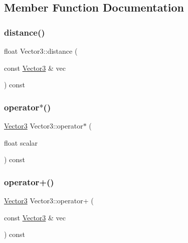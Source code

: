 \subsection{Member Function Documentation}
\mbox{\label{class_vector3_a9dd2015e58d753dd4e3f1ba47eeaaf35}} 
\subsubsection{\texorpdfstring{distance()}{distance()}}
{\footnotesize\ttfamily float Vector3\+::distance (\begin{DoxyParamCaption}\item[{const \hyperlink{class_vector3}{Vector3} \&}]{vec }\end{DoxyParamCaption}) const\hspace{0.3cm}{\ttfamily [inline]}}

\mbox{\label{class_vector3_ad572247e5bd9afab9d1639610f0b0ac6}} 
\subsubsection{\texorpdfstring{operator$\ast$()}{operator*()}}
{\footnotesize\ttfamily \hyperlink{class_vector3}{Vector3} Vector3\+::operator$\ast$ (\begin{DoxyParamCaption}\item[{float}]{scalar }\end{DoxyParamCaption}) const\hspace{0.3cm}{\ttfamily [inline]}}

\mbox{\label{class_vector3_a87c9bc23295bebc6b36fd9b9c9abda67}} 
\subsubsection{\texorpdfstring{operator+()}{operator+()}}
{\footnotesize\ttfamily \hyperlink{class_vector3}{Vector3} Vector3\+::operator+ (\begin{DoxyParamCaption}\item[{const \hyperlink{class_vector3}{Vector3} \&}]{vec }\end{DoxyParamCaption}) const\hspace{0.3cm}{\ttfamily [inline]}}

